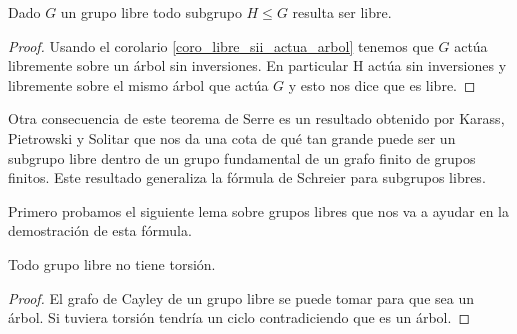 \documentclass[tesis.tex]{subfiles}
\begin{document}
\begin{coro}\label{coro_niels_sch}
	Dado $G$ un grupo libre todo subgrupo $H \le G$ resulta ser libre.
\end{coro}
\begin{proof} 
	Usando el corolario \ref{coro_libre_sii_actua_arbol} tenemos que $G$ actúa libremente sobre un árbol sin inversiones.
	En particular H actúa sin inversiones y libremente sobre el mismo árbol que actúa $G$ y esto nos dice que es libre.
\end{proof}

Otra consecuencia de este teorema de Serre es un resultado obtenido por Karass, Pietrowski y Solitar que nos da una cota de qué tan grande puede ser un subgrupo libre dentro de un grupo fundamental de un grafo finito de grupos finitos.
Este resultado generaliza la fórmula de Schreier para subgrupos libres.


Primero probamos el siguiente lema sobre grupos libres que nos va a ayudar en la demostración de esta fórmula.

\begin{lema}\label{lema_libre_torsion}
	Todo grupo libre \fg no tiene torsión.
\end{lema}
\begin{proof}
	El grafo de Cayley de un grupo libre se puede tomar para que sea un árbol.
	Si tuviera torsión tendría un ciclo contradiciendo que es un árbol.
\end{proof}
\end{document}

